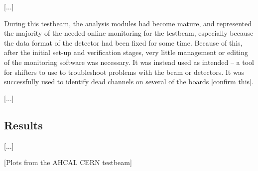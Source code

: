[...]

During this testbeam, the analysis modules had become mature, and represented the majority of the needed online monitoring for the testbeam, especially because the data format of the detector had been fixed for some time. Because of this, after the initial set-up and verification stages, very little management or editing of the monitoring software was necessary. It was instead used as intended -- a tool for shifters to use to troubleshoot problems with the beam or detectors. It was successfully used to identify dead channels on several of the boards [confirm this].

[...]

\subsection{Results}
[...]

\begin{center}
	[Plots from the AHCAL CERN testbeam]
\end{center}

